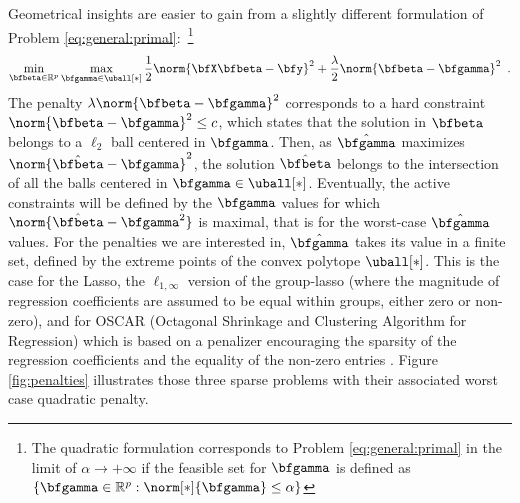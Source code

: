 Geometrical insights are easier to gain from a slightly different formulation of
Problem \eqref{eq:general:primal}:~\footnote{%
The quadratic formulation corresponds to Problem \eqref{eq:general:primal} in 
the limit of $\alpha\rightarrow+\infty$ if the feasible set for $\bfgamma$ is
defined as $\left\{\bfgamma\in\mathbb{R}^p:\norm[*]{\bfgamma}\leq
\alpha\right\}$
}
%
\begin{equation}\label{eq:general:dual}
  \min_{\bfbeta\in\mathbb{R}^p} \max_{\bfgamma\in\uball[*]}
    \frac{1}{2} \norm{\bfX \bfbeta - \bfy}^2 + \frac{\lambda}{2} \norm{\bfbeta - \bfgamma}^2
  \enspace.
\end{equation}
The penalty $\lambda\norm{\bfbeta - \bfgamma}^2$ corresponds to a hard
constraint $\norm{\bfbeta - \bfgamma}^2\leq c$, which states that the 
solution in $\bfbeta$ belongs to a $\ell_{2}$ ball centered in $\bfgamma$.
Then, as $\hat{\bfgamma}$ maximizes $\norm{\hat{\bfbeta} - \bfgamma}^2$, the
solution $\hat{\bfbeta}$ belongs to the intersection of all the balls
centered in $\bfgamma\in\uball[*]$.
Eventually, the active constraints will be defined by the $\bfgamma$ values for
which $\norm{\hat{\bfbeta} - {\bfgamma}^2}$ is maximal, that is for the
worst-case $\hat{\bfgamma}$ values. 
For the penalties we are interested in, $\hat{\bfgamma}$ takes its value in a
finite set, defined by the extreme points of the convex polytope $\uball[*]$.
% 
% 
This is the case for the Lasso,
the $\ell_{1,\infty}$ version of the group-lasso 
(where the magnitude of regression coefficients are assumed to be equal within
groups, either zero or non-zero), 
and for OSCAR (Octagonal Shrinkage and Clustering Algorithm for Regression)
which is based on a penalizer encouraging the sparsity of the regression
coefficients and the equality of the non-zero entries \citep{Bondell08}.
%
Figure \ref{fig:penalties} illustrates  those three  sparse problems
with their  associated worst case quadratic penalty.



